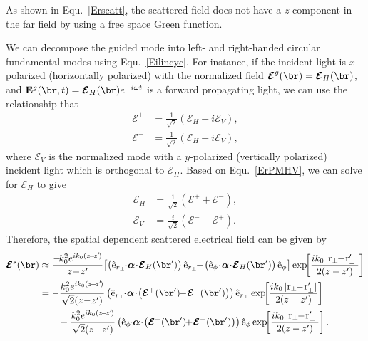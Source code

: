 \documentclass[]{report}
\begin{document}
As shown in Equ.~\ref{Erscatt}, the scattered field does not have a $ z $-component in the far field by using a free space Green function. 

We can decompose the guided mode into left- and right-handed circular fundamental modes using Equ.~\ref{Eilincyc}. For instance, if the incident light is $ x $-polarized (horizontally polarized) with the normalized field $ \boldsymbol{\mathcal{E}}^g (\br)=\boldsymbol{\mathcal{E}}_H (\br) $, and $ \mathbf{E}^g (\br,t) = \boldsymbol{\mathcal{E}}_H(\br)e^{-i\omega t} $ is a forward propagating light, we can use the relationship that
\begin{subequations}
\label{ErPMHV}
\begin{align}
\boldsymbol{\mathcal{E}}^+ &= \frac{1}{\sqrt{2}} \left(\boldsymbol{\mathcal{E}}_H+i\boldsymbol{\mathcal{E}}_V \right),\\
\boldsymbol{\mathcal{E}}^- &= \frac{1}{\sqrt{2}} \left( \boldsymbol{\mathcal{E}}_H-i\boldsymbol{\mathcal{E}}_V \right),
\end{align}
\end{subequations}
where $ \boldsymbol{\mathcal{E}}_V $ is the normalized mode with a $ y $-polarized (vertically polarized) incident light which is orthogonal to $ \boldsymbol{\mathcal{E}}_H $. Based on Equ.~\ref{ErPMHV}, we can solve for $ \boldsymbol{\mathcal{E}}_H $ to give
\begin{align}
\boldsymbol{\mathcal{E}}_H &= \frac{1}{\sqrt{2}} \left(\boldsymbol{\mathcal{E}}^+ + \boldsymbol{\mathcal{E}}^- \right),\\
\boldsymbol{\mathcal{E}}_V &= \frac{i}{\sqrt{2}} \left( \boldsymbol{\mathcal{E}}^- -\boldsymbol{\mathcal{E}}^+ \right). 
\end{align}
Therefore, the spatial dependent scattered electrical field can be given by
\begin{align}
\boldsymbol{\mathcal{E}}^s(\br) &\approx  \frac{-\!k_0^2 e^{ik_0(z\!-\!z'\!)}}{z\!-\!z'}\! \left[\left(\hat{\mathrm{e}}_{r_\perp} \!\!\cdot\! \boldsymbol{\alpha}\!\cdot\! \boldsymbol{\mathcal{E}}_H(\br')\right)\hat{\mathrm{e}}_{r_\perp} \!\!  +\! \left(\hat{\mathrm{e}}_\phi\!\cdot\! \boldsymbol{\alpha}\!\cdot\! \boldsymbol{\mathcal{E}}_H(\br') \right)\hat{\mathrm{e}}_\phi \right] \exp\!\! \left[ \frac{ik_0 \left| \mathrm{r}_\perp\!\! -\! \mathrm{r}_\perp'\right|}{2(z-z')}  \right]\\
&= - \frac{k_0^2 e^{ik_0(z\!-\!z'\!)}}{\sqrt{2}(z\!-\!z')} \left(\hat{\mathrm{e}}_{r_\perp} \!\!\cdot\! \boldsymbol{\alpha}\!\cdot\! \left(\boldsymbol{\mathcal{E}}^+ (\br') \!\! +\! \boldsymbol{\mathcal{E}}^- (\br') \right)\right)\hat{\mathrm{e}}_{r_\perp}  \exp\!\! \left[ \frac{ik_0 \left| \mathrm{r}_\perp\!\! -\! \mathrm{r}_\perp'\right|}{2(z-z')}  \right] \nonumber\\
&\qquad - \frac{k_0^2 e^{ik_0(z\!-\!z'\!)}}{\sqrt{2}(z\!-\!z')} \left(\hat{\mathrm{e}}_{\phi} \!\!\cdot\! \boldsymbol{\alpha}\!\cdot\! \left(\boldsymbol{\mathcal{E}}^+ (\br') \!\! +\! \boldsymbol{\mathcal{E}}^- (\br') \right)\right)\hat{\mathrm{e}}_{\phi}  \exp\!\! \left[ \frac{ik_0 \left| \mathrm{r}_\perp\!\! -\! \mathrm{r}_\perp'\right|}{2(z-z')}  \right]. \label{Ers0}
\end{align}
\end{document}
